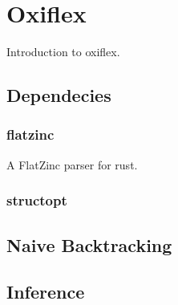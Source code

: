 
\chapter{Oxiflex}

Introduction to oxiflex.

\section{Dependecies}

\subsection{flatzinc}

A FlatZinc parser for rust.

\subsection{structopt}



\section{Naive Backtracking}

\section{Inference}


